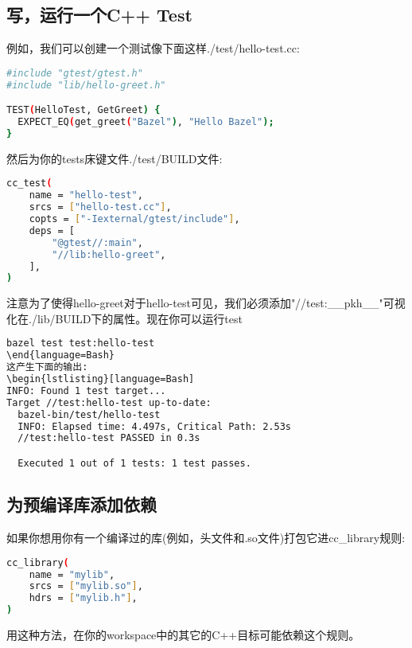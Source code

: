 \subsection{写，运行一个C++ Test}
例如，我们可以创建一个测试像下面这样./test/hello-test.cc:
\begin{lstlisting}[language=Bash]
#include "gtest/gtest.h"
#include "lib/hello-greet.h"

TEST(HelloTest, GetGreet) {
  EXPECT_EQ(get_greet("Bazel"), "Hello Bazel");
}
\end{lstlisting}
然后为你的tests床键文件./test/BUILD文件:
\begin{lstlisting}[language=Bash]
cc_test(
    name = "hello-test",
    srcs = ["hello-test.cc"],
    copts = ["-Iexternal/gtest/include"],
    deps = [
        "@gtest//:main",
        "//lib:hello-greet",
    ],
)
\end{lstlisting}
注意为了使得hello-greet对于hello-test可见，我们必须添加"//test:\_\_pkh\_\_"可视化在./lib/BUILD下的属性。现在你可以运行test
\begin{lstlisting}[language=Bash]
bazel test test:hello-test
\end{language=Bash}
这产生下面的输出:
\begin{lstlisting}[language=Bash]
INFO: Found 1 test target...
Target //test:hello-test up-to-date:
  bazel-bin/test/hello-test
  INFO: Elapsed time: 4.497s, Critical Path: 2.53s
  //test:hello-test PASSED in 0.3s

  Executed 1 out of 1 tests: 1 test passes.
\end{lstlisting}
\subsection{为预编译库添加依赖}
如果你想用你有一个编译过的库(例如，头文件和.so文件)打包它进cc\_library规则:
\begin{lstlisting}[language=Bash]
cc_library(
    name = "mylib",
    srcs = ["mylib.so"],
    hdrs = ["mylib.h"],
)
\end{lstlisting}
用这种方法，在你的workspace中的其它的C++目标可能依赖这个规则。
